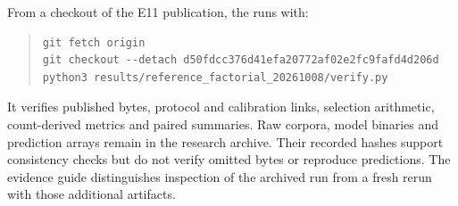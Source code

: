 From a checkout of the E11 publication, the  runs with:
\begin{quote}\small
\begin{verbatim}
git fetch origin
git checkout --detach d50fdcc376d41efa20772af02e2fc9fafd4d206d
python3 results/reference_factorial_20261008/verify.py
\end{verbatim}
\end{quote}
It verifies published bytes, protocol and calibration links, selection arithmetic, count-derived metrics and paired summaries. Raw corpora, model binaries and prediction arrays remain in the research archive. Their recorded hashes support consistency checks but do not verify omitted bytes or reproduce predictions. The evidence guide distinguishes inspection of the archived run from a fresh rerun with those additional artifacts.
